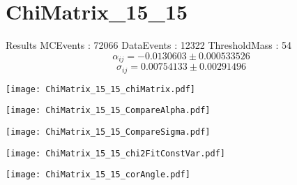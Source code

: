 \documentclass[a4paper,12pt]{article}
\begin{document}
\section{ChiMatrix\_15\_15}
\begin{minipage}{0.49\linewidth} Results \newline
MCEvents : 72066\newline
DataEvents : 12322 \newline
ThresholdMass : 54\\
$$\alpha_{ij} = -0.0130603\pm 0.000533526$$
$$\sigma_{ij} = 0.00754133\pm 0.00291496$$
\end{minipage}\hfill
\begin{minipage}{0.49\linewidth} 
\texttt{[image: ChiMatrix\_15\_15\_chiMatrix.pdf]}\\
\end{minipage}
\hfill
\begin{minipage}{0.49\linewidth} 
\texttt{[image: ChiMatrix\_15\_15\_CompareAlpha.pdf]}\\
\end{minipage}
\hfill
\begin{minipage}{0.49\linewidth} 
\texttt{[image: ChiMatrix\_15\_15\_CompareSigma.pdf]}\\
\end{minipage}
\begin{minipage}{0.49\linewidth} 
\texttt{[image: ChiMatrix\_15\_15\_chi2FitConstVar.pdf]}\\
\end{minipage}
\hfill
\begin{minipage}{0.49\linewidth} 
\texttt{[image: ChiMatrix\_15\_15\_corAngle.pdf]}\\
\end{minipage}
\end{document}
